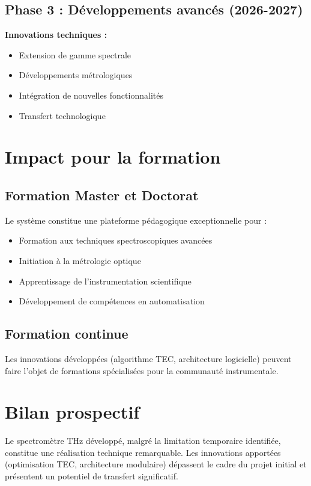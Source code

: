 \subsection{Phase 3 : Développements avancés (2026-2027)}

\textbf{Innovations techniques :}
\begin{itemize}
    \item Extension de gamme spectrale
    \item Développements métrologiques
    \item Intégration de nouvelles fonctionnalités
    \item Transfert technologique
\end{itemize}

\section{Impact pour la formation}

\subsection{Formation Master et Doctorat}

Le système constitue une plateforme pédagogique exceptionnelle pour :
\begin{itemize}
    \item Formation aux techniques spectroscopiques avancées
    \item Initiation à la métrologie optique
    \item Apprentissage de l'instrumentation scientifique
    \item Développement de compétences en automatisation
\end{itemize}

\subsection{Formation continue}

Les innovations développées (algorithme TEC, architecture logicielle) peuvent faire l'objet de formations spécialisées pour la communauté instrumentale.

\section{Bilan prospectif}

Le spectromètre THz développé, malgré la limitation temporaire identifiée, constitue une réalisation technique remarquable. Les innovations apportées (optimisation TEC, architecture modulaire) dépassent le cadre du projet initial et présentent un potentiel de transfert significatif.

